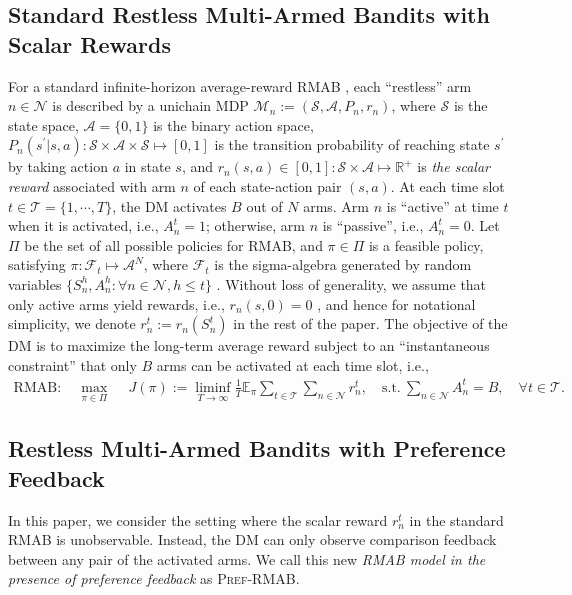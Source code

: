 \documentclass{article} %
\def\gA{{\mathcal{A}}}
\def\gF{{\mathcal{F}}}
\def\gM{{\mathcal{M}}}
\def\gN{{\mathcal{N}}}
\newcommand{\RMABPF}{\textsc{Pref-RMAB}\xspace}
\newcommand{\cT}{\mathcal{T}}
\newcommand{\cA}{\mathcal{A}}
\newcommand{\cS}{\mathcal{S}}
\newcommand{\cN}{\mathcal{N}}
\begin{document}
\subsection{Standard Restless Multi-Armed Bandits with Scalar Rewards}\label{sec:RMAB}
For a standard infinite-horizon average-reward RMAB \citep{whittle1988restless}, each ``restless'' arm  $n\in\gN$ is described by a unichain MDP \citep{puterman1994markov} $\gM_n:=(\cS, \cA, P_n, r_n)$, where $\cS$ is the state space, $\cA=\{0, 1\}$ 
is the binary action space, $P_n(s^\prime|s, a):\cS\times\cA\times\cS\mapsto [0,1]$ is the transition probability of reaching state $s^\prime$ by taking action $a$ in state $s$, and $r_n(s,a)\in[0,1]: \cS\times\cA\mapsto \mathbb{R}^+$ is \textit{the scalar reward} 
associated with arm $n$ of each state-action pair $(s,a)$.  
At each time slot $t\in\cT=\{1,\cdots, T\}$, the DM activates $B$ out of $N$ arms. Arm $n$ is ``active'' at time $t$ when it is activated, i.e., $A_n^t=1$; otherwise, arm $n$ is ``passive'', i.e., $A_n^t=0$.  Let $\Pi$ be the set of all possible policies for RMAB, and $\pi\in\Pi$ is a feasible policy, satisfying $\pi: \gF_t \mapsto \gA^{N}$, where $\gF_t$ is the sigma-algebra generated by random variables $ \{S_n^h, A_n^h: \forall n\in\gN, h \leq t \}$ \citep{avrachenkov2022whittle}. Without loss of generality, we assume that only active arms yield rewards, i.e., $r_n(s,0)=0$ \citep{akbarzadeh2022learning,xiong2022Nips}, and hence for notational simplicity, we denote $r_n^t:=r_n(S_n^t)$ in the rest of the paper. The objective of the DM is to maximize the long-term average reward subject to an ``instantaneous constraint'' that only $B$ arms can be activated at each time slot, i.e., 
 \begin{align}\label{eq:RMAB}
\text{RMAB}: \quad\max_{\pi\in\Pi} & ~~J(\pi):=\liminf_{T\rightarrow \infty} \frac{1}{T} \mathbb{E}_\pi \sum_{t\in\cT}\sum_{n\in\cN}  r_n^t, \quad 
 \mbox{s.t.}~\sum_{n\in\cN}A_n^t=B,\quad \forall t\in\cT.
\end{align}


\subsection{Restless Multi-Armed Bandits with Preference Feedback}\label{sec:RMABPF}
In this paper, we consider the setting where the scalar reward $r_n^t$ in the standard RMAB is unobservable. Instead, the DM can only observe comparison feedback between any pair of the activated arms. We call this new \textit{RMAB model in the presence of preference feedback} as \RMABPF. 
\end{document}
